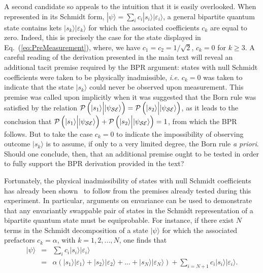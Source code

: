 \documentclass[12pt]{iopart}
\begin{document}
 A second candidate  so appeals to the intuition that it is easily overlooked. When represented in its Schmidt form, $|\psi\rangle = \sum_i c_i |s_i\rangle|\varepsilon_i\rangle$, a general bipartite quantum state contains kets $|s_k\rangle|\varepsilon_k\rangle$ for which the associated coefficients $c_k$ are equal to zero. Indeed, this is precisely the case for the state displayed in Eq.~(\ref{eq:PreMeasurement}), where, we have $c_1=c_2=1/\sqrt{2}$, $c_k=0$ for $k\geq3$. A careful reading of the derivation presented in the main text will reveal an additional tacit premise required by the BPR argument: states with null Schmidt coefficients were taken to be physically inadmissible, \textit{i.e.} $c_k=0$ was taken to indicate that the state $|s_k\rangle$ could never be observed upon measurement. This premise was called upon implicitly when it was suggested that the Born rule was satisfied by the relation ${\cal P}\left(|s_1\rangle {\Big |} |\psi_{\cal SE} \rangle \right)={\cal P}\left(|s_2\rangle {\Big |} |\psi_{\cal SE} \rangle \right)$, as it leads to the conclusion that ${\cal P}\left(|s_1\rangle {\Big |} |\psi_{\cal SE} \rangle \right)+{\cal P}\left(|s_2\rangle {\Big |} |\psi_{\cal SE} \rangle \right)=1$, from which the BPR follows. But to take the case $c_k=0$ to indicate the impossibility of observing outcome $|s_k\rangle$ is to assume, if only to a very limited degree, the Born rule \textit{a priori}. Should one conclude, then, that an additional premise ought to be tested in order to fully support the BPR derivation provided in the text?
%

Fortunately, the physical inadmissibility of states with null Schmidt coefficients has already been shown~\cite{zurek:08} to follow from the premises already tested during this experiment. In particular, arguments on envariance can be used to demonstrate that any envariantly swappable pair of states in the Schmidt representation of a bipartite quantum state must be equiprobable. For instance, if there exist $N$ terms in the Schmidt decomposition of a state $|\psi\rangle$ for which the associated prefactors $c_k=\alpha$, with $k=1,2,...,N$, one finds that
%
\begin{eqnarray}\label{eq:nullschmidt1}
	|\psi\rangle&=& \sum_i c_i |s_i\rangle|\varepsilon_i\rangle\\\nonumber 
	&=& \alpha\left(|s_1\rangle|\varepsilon_1\rangle + |s_2\rangle|\varepsilon_2\rangle + ... + |s_N\rangle|\varepsilon_N\rangle \right)+ \sum_{i=N+1}c_i |s_i\rangle|\varepsilon_i\rangle.
\end{eqnarray}
%
\end{document}
